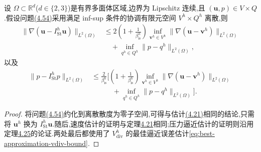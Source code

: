 \begin{lemma}\label{lem:stokes-projection-approximation}
设 $\Omega\subset\mathbb{R}^d$($d\in\{2,3\}$)是有界多面体区域,边界为 Lipschitz 连续,且 $(\bm{u},p)\in V\times Q$.假设问题\hyperref[eq:stokes-projection-definition]{(4.54)}采用满足 inf-sup 条件的协调有限元空间 $V^h\times Q^h$ 离散,则
\begin{equation}\label{eq:stokes-projection-best-approximation-velocity}
\begin{aligned}
  \|\nabla(\bm{u}-I_{\mathrm{St}}^h\bm{u})\|_{L^2(\Omega)}
  &\leq 2\left(1+\frac{1}{\beta_{\mathrm{is}}^h}\right)
      \inf_{\bm{v}^h\in V^h}
      \|\nabla(\bm{u}-\bm{v}^h)\|_{L^2(\Omega)}\\
  &\quad+\inf_{q^h\in Q^h}\|p-q^h\|_{L^2(\Omega)},
\end{aligned}
\end{equation}
以及
\begin{equation}\label{eq:stokes-projection-best-approximation-pressure}
\begin{aligned}
  \|p-I_{\mathrm{St}}^hp\|_{L^2(\Omega)}
  &\leq \frac{2}{\beta_{\mathrm{is}}^h}
       \Biggl[\left(1+\frac{1}{\beta_{\mathrm{is}}^h}\right)
       \inf_{\bm{v}^h\in V^h}
       \|\nabla(\bm{u}-\bm{v}^h)\|_{L^2(\Omega)}\\
  &\qquad\quad+\inf_{q^h\in Q^h}\|p-q^h\|_{L^2(\Omega)}\Biggr].
\end{aligned}
\end{equation}
\end{lemma}
\begin{proof}
将问题\hyperref[eq:stokes-projection-definition]{(4.54)}约化到离散散度为零子空间,可得与估计\hyperref[eq:stokes-error-velocity-h1]{(4.21)}相同的结论,只需将 $\bm{u}^h$ 换为 $I_{\mathrm{St}}^h\bm{u}$.随后,速度估计的证明与定理\hyperref[thm:stokes-error-velocity-h1]{4.21}相同;压力逼近估计的证明则沿用定理\hyperref[thm:stokes-error-pressure-l2]{4.25}的论证.两处最后都使用了 $V_{\mathrm{div}}^h$ 的最佳逼近误差估计\cref{eq:best-approximation-vdiv-bound}.
\end{proof}

